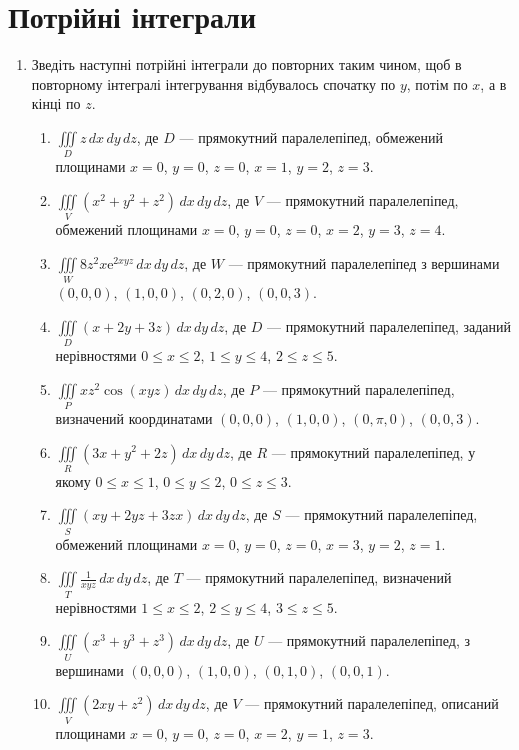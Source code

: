 \section{Потрійні інтеграли}
\begin{enumerate}
\item Зведіть наступні потрійні інтеграли до повторних таким чином, щоб в повторному інтегралі інтегрування відбувалось спочатку по $y$, потім по $x$, а в кінці по $z$.
    \begin{enumerate}[label=\arabic*.]
        \item $\iiint\limits_D z \,dx\,dy\,dz$, де $D$ --- прямокутний паралелепіпед, обмежений площинами $x = 0$, $y = 0$, $z = 0$, $x = 1$, $y = 2$, $z = 3$.
        \item  $\iiint\limits_{V} \left(x^2 + y^2 + z^2\right) \, dx \, dy \, dz$, де $V$ --- прямокутний паралелепіпед, обмежений площинами $x = 0$, $y = 0$, $z = 0$, $x = 2$, $y = 3$, $z = 4$.
        \item $\iiint\limits_{W} 8 z^{2} x {\mathrm e}^{2 x y z} \, dx \, dy \, dz$, де $W$ --- прямокутний паралелепіпед з вершинами $(0,0,0)$, $(1,0,0)$, $(0,2,0)$, $(0,0,3)$.
        \item $\iiint\limits_{D} \left(x + 2y + 3z\right) \, dx \, dy \, dz$, де $D$ --- прямокутний паралелепіпед, заданий нерівностями $0 \leq x \leq 2$, $1 \leq y \leq 4$, $2 \leq z \leq 5$.
        \item  $\iiint\limits_{P} x z^{2} \cos\left(x y z\right) \, dx \, dy \, dz$, де $P$ --- прямокутний паралелепіпед, визначений координатами $(0,0,0)$, $(1,0,0)$, $(0,\pi,0)$, $(0,0,3)$.
        \item $\iiint\limits_{R} \left(3x + y^2 + 2z\right) \, dx \, dy \, dz$, де $R$ --- прямокутний паралелепіпед, у якому $0 \leq x \leq 1$, $0 \leq y \leq 2$, $0 \leq z \leq 3$.
        \item $\iiint\limits_{S} \left(xy + 2yz + 3zx\right) \, dx \, dy \, dz$, де $S$ --- прямокутний паралелепіпед, обмежений площинами $x = 0$, $y = 0$, $z = 0$, $x = 3$, $y = 2$, $z = 1$.
        \item $\iiint\limits_{T} \frac{1}{xyz} \, dx \, dy \, dz$, де $T$ --- прямокутний паралелепіпед, визначений нерівностями $1 \leq x \leq 2$, $2 \leq y \leq 4$, $3 \leq z \leq 5$.
        \item $\iiint\limits_{U} \left(x^3 + y^3 + z^3\right) \, dx \, dy \, dz$, де $U$ --- прямокутний паралелепіпед, з вершинами $(0,0,0)$, $(1,0,0)$, $(0,1,0)$, $(0,0,1)$.
        \item  $\iiint\limits_{V} \left(2xy + z^2\right) \, dx \, dy \, dz$, де $V$ --- прямокутний паралелепіпед, описаний площинами $x = 0$, $y = 0$, $z = 0$, $x = 2$, $y = 1$, $z = 3$.

\end{enumerate}
\end{enumerate}
